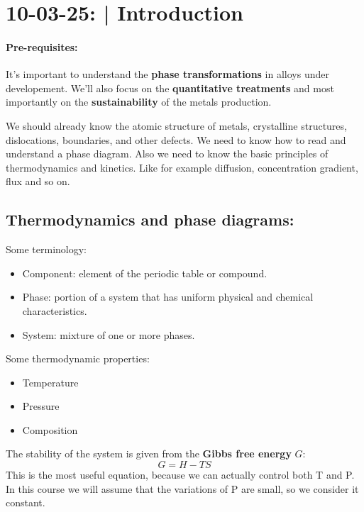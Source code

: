 \section{10-03-25: | Introduction}

\paragraph{Pre-requisites:}
It's important to understand the \textbf{phase transformations} in alloys under developement.
We'll also focus on the \textbf{quantitative treatments} and most importantly on the \textbf{sustainability} of the metals production.

We should already know the atomic structure of metals, crystalline structures, dislocations, boundaries, and other defects. We need to know how to read and understand a phase diagram. Also we need to know the basic principles of thermodynamics and kinetics. Like for example diffusion, concentration gradient, flux and so on.

\subsection{Thermodynamics and phase diagrams:} 
Some terminology:
\begin{itemize}
    \item Component: element of the periodic table or compound.
    \item Phase: portion of a system that has uniform physical and chemical characteristics.
    \item System: mixture of one or more phases.
\end{itemize}
Some thermodynamic properties:
\begin{itemize}
    \item Temperature
    \item Pressure
    \item Composition
\end{itemize}
The stability of the system is given from the \textbf{Gibbs free energy} $G$:
\begin{equation}
    G = H - TS
\end{equation}
This is the most useful equation, because we can actually control both T and P. In this course we will assume that the variations of P are small, so we consider it constant. 

